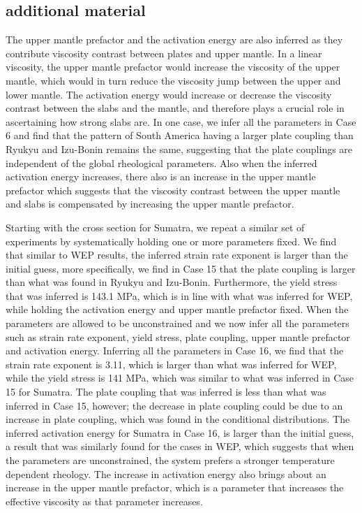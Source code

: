 \documentclass[12pt]{article}
\begin{document}
{\subsection{additional material}

The upper mantle prefactor and the activation energy are also inferred as they contribute viscosity contrast between plates and upper mantle. In a linear viscosity, the upper mantle prefactor would increase the viscosity of the upper mantle, which would in turn reduce the viscosity jump between the upper and lower mantle. The activation energy would increase or decrease the viscosity contrast between the slabs and the mantle, and therefore plays a crucial role in ascertaining how strong slabs are.  In one case, we infer all the parameters in Case 6 and find that the pattern of South America having a larger plate coupling than Ryukyu and Izu-Bonin remains the same, suggesting that the plate couplings are independent of the global rheological parameters. Also when the inferred activation energy increases, there also is an increase in the upper mantle prefactor which suggests that the viscosity contrast between the upper mantle and slabs is compensated by increasing the upper mantle prefactor. 




Starting with the cross section for Sumatra, we repeat a similar set of experiments by systematically holding one or more parameters fixed. We find that similar to WEP results, the inferred strain rate exponent is larger than the initial guess, more specifically, we find in Case 15 that the plate coupling is larger than what was found in Ryukyu and Izu-Bonin. Furthermore, the yield stress that was inferred is 143.1 MPa, which is in line with what was inferred for WEP, while holding the activation energy and upper mantle prefactor fixed. When the parameters are allowed to be unconstrained and we now infer all the parameters such as strain rate exponent, yield stress, plate coupling, upper mantle prefactor and activation energy. Inferring all the parameters in Case 16, we find that the strain rate exponent is 3.11, which is larger than what was inferred for WEP, while the yield stress is 141 MPa, which was similar to what was inferred in Case 15 for Sumatra. The plate coupling that was inferred is less than what was inferred in Case 15, however; the decrease in plate coupling could be due to an increase in plate coupling, which was found in the conditional distributions. The inferred activation energy for Sumatra in Case 16, is larger than the initial guess, a result that was similarly found for the cases in WEP, which suggests that when the parameters are unconstrained, the system prefers a stronger temperature dependent rheology. The increase in activation energy also brings about an increase in the upper mantle prefactor, which is a parameter that increases the effective viscosity as that parameter increases. 

}
\end{document}

